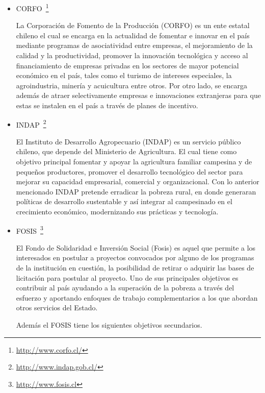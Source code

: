 \begin{enumerate}[(a)]
\begin{itemize}
                \item CORFO~\footnote{\url{http://www.corfo.cl/}}

                    La Corporación de Fomento de la Producción (CORFO) es un ente estatal chileno el cual se encarga en la
                    actualidad de fomentar e innovar en el país mediante programas de asociatividad entre empresas,
                    el mejoramiento de la calidad y la productividad, promover la innovación tecnológica  y acceso
                    al financiamiento de empresas privadas en los sectores de mayor potencial económico en el país,
                    tales como el turismo de intereses especiales, la agroindustria,  minería y acuicultura entre otros.
                    Por otro lado, se encarga además de atraer selectivamente empresas e innovaciones extranjeras para que estas se instalen en el país a través de planes de incentivo.

                \item INDAP~\footnote{\url{http://www.indap.gob.cl/}}

                    El Instituto de Desarrollo Agropecuario (INDAP) es un servicio público chileno, que depende del Ministerio de Agricultura.
                    El cual tiene como objetivo principal  fomentar y apoyar la agricultura familiar campesina y de pequeños productores,
                    promover el desarrollo tecnológico del sector para mejorar su capacidad empresarial, comercial y organizacional.
                    Con lo anterior mencionado INDAP pretende erradicar la pobreza rural, en donde generaran políticas de desarrollo
                    sustentable y así integrar al campesinado en el crecimiento económico, modernizando sus prácticas y tecnología.

                \item FOSIS~\footnote{\url{http://www.fosis.cl}}

                    El Fondo de Solidaridad e Inversión Social (Fosis) es aquel que permite a los interesados en postular a proyectos convocados
                    por alguno de los programas de la institución en cuestión, la posibilidad de retirar o adquirir las bases de licitación para
                    postular al proyecto. Uno de sus principales objetivos es contribuir al país ayudando a la superación de la pobreza a través
                    del esfuerzo y aportando enfoques de trabajo complementarios a los que abordan otros servicios del Estado.

                    Además el FOSIS tiene los siguientes objetivos secundarios.


\end{itemize}
\end{enumerate}
